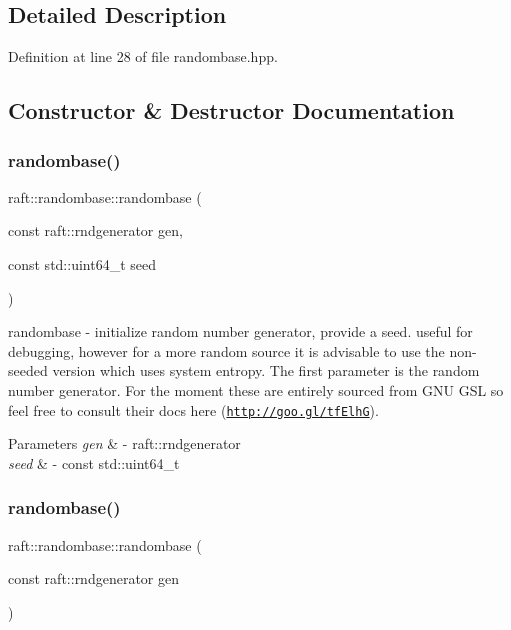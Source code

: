 \subsection{Detailed Description}


Definition at line 28 of file randombase.\+hpp.



\subsection{Constructor \& Destructor Documentation}
\hypertarget{classraft_1_1randombase_a52ce4d35a23a557706015dfcda80ea2f}{}\label{classraft_1_1randombase_a52ce4d35a23a557706015dfcda80ea2f} 
\subsubsection{\texorpdfstring{randombase()}{randombase()}\hspace{0.1cm}{\footnotesize\ttfamily [1/2]}}
{\footnotesize\ttfamily raft\+::randombase\+::randombase (\begin{DoxyParamCaption}\item[{const raft\+::rndgenerator}]{gen,  }\item[{const std\+::uint64\+\_\+t}]{seed }\end{DoxyParamCaption})}

randombase -\/ initialize random number generator, provide a seed. useful for debugging, however for a more random source it is advisable to use the non-\/seeded version which uses system entropy. The first parameter is the random number generator. For the moment these are entirely sourced from G\+NU G\+SL so feel free to consult their docs here (\href{http://goo.gl/tfElhG}{\tt http\+://goo.\+gl/tf\+ElhG}). 
\begin{DoxyParams}{Parameters}
{\em gen} & -\/ raft\+::rndgenerator \\
\hline
{\em seed} & -\/ const std\+::uint64\+\_\+t \\
\hline
\end{DoxyParams}
\hypertarget{classraft_1_1randombase_a266855acd0445688838787a7c1bcdee7}{}\label{classraft_1_1randombase_a266855acd0445688838787a7c1bcdee7} 
\subsubsection{\texorpdfstring{randombase()}{randombase()}\hspace{0.1cm}{\footnotesize\ttfamily [2/2]}}
{\footnotesize\ttfamily raft\+::randombase\+::randombase (\begin{DoxyParamCaption}\item[{const raft\+::rndgenerator}]{gen }\end{DoxyParamCaption})}

